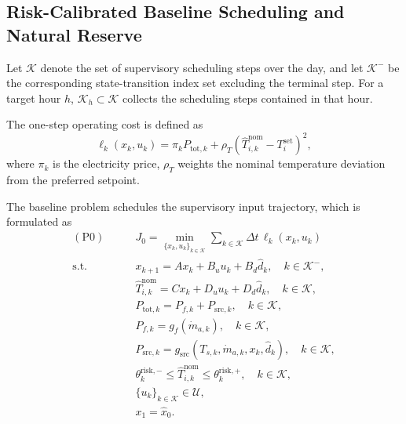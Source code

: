 \documentclass[journal]{IEEEtran}
\theoremstyle{remark}
\begin{document}
	\subsection{Risk-Calibrated Baseline Scheduling and Natural Reserve}
	\label{subsec:baseline_natural_reserve}
	
	Let \(\mathcal{K}\) denote the set of supervisory scheduling steps over
	the day, and let \(\mathcal{K}^{-}\) be the corresponding
	state-transition index set excluding the terminal step. For a target
	hour \(h\), \(\mathcal{K}_h\subset\mathcal{K}\) collects the scheduling
	steps contained in that hour.
	
	The one-step operating cost is defined as
	\begin{equation}
		\ell_k(x_k,u_k)
		=
		\pi_k P_{\mathrm{tot},k}
		+
		\rho_T
		\left(
		\hat T_{i,k}^{\mathrm{nom}}-T_i^{\mathrm{set}}
		\right)^2 ,
		\label{eq:stage_cost}
	\end{equation}
	where \(\pi_k\) is the electricity price, \(\rho_T\) weights the nominal temperature deviation from the preferred setpoint.
	
	The baseline problem schedules the supervisory input trajectory, which is formulated as
	\begin{subequations}
		\label{prob:P0}
		\begin{align}
			(\mathrm{P0})\qquad
			&J_0=
			\min_{\{x_k,u_k\}_{k\in\mathcal{K}}}
			\sum_{k\in\mathcal{K}}
			\Delta t\,\ell_k(x_k,u_k)
			\label{eq:p0_obj}
			\\
			\mathrm{s.t.}\qquad
			&
			x_{k+1}
			=
			A x_k+B_u u_k+B_d\hat d_k,
			\quad k\in\mathcal{K}^{-},
			\label{eq:p0_dyn}
			\\
			&
			\hat T_{i,k}^{\mathrm{nom}}
			=
			C x_k+D_u u_k+D_d\hat d_k,
			\quad k\in\mathcal{K},
			\label{eq:p0_temp}
			\\
			&
			P_{\mathrm{tot},k}
			=
			P_{f,k}+P_{\mathrm{src},k},
			\quad k\in\mathcal{K},
			\label{eq:p0_total_power}
			\\
			&
			P_{f,k}
			=
			g_f(\dot m_{a,k}),
			\quad k\in\mathcal{K},
			\label{eq:p0_fan_power}
			\\
			&
			P_{\mathrm{src},k}
			=
			g_{\mathrm{src}}
			(T_{s,k},\dot m_{a,k},x_k,\hat d_k),
			\quad k\in\mathcal{K},
			\label{eq:p0_src_power}
			\\
			&
			\theta_{k}^{\mathrm{risk},-}
			\le
			\hat T_{i,k}^{\mathrm{nom}}
			\le
			\theta_{k}^{\mathrm{risk},+},
			\quad k\in\mathcal{K},
			\label{eq:p0_risk_comfort}
			\\
			&
			\{u_k\}_{k\in\mathcal{K}}\in\mathcal{U},
			\label{eq:p0_control_set}
			\\
			&
			x_1=\hat x_0 .
			\label{eq:p0_initial}
		\end{align}
	\end{subequations}
	
\end{document}
